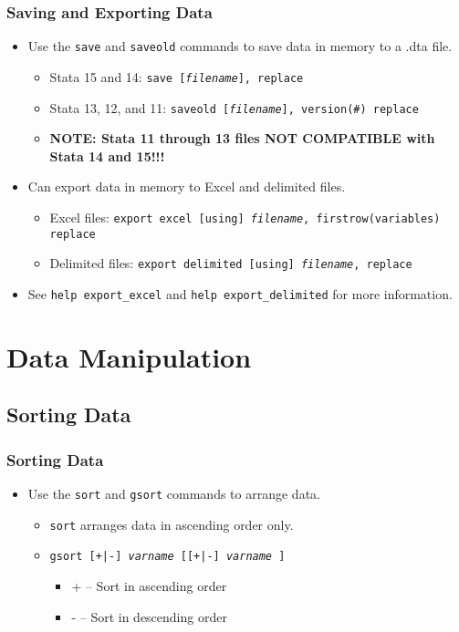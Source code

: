 \documentclass{beamer}
\begin{document}
\begin{frame}
	\frametitle{Saving and Exporting Data}
		\begin{itemize}
			\item Use the \texttt{save} and \texttt{saveold} commands to save data in memory to a .dta file.
				\begin{itemize}
					\item Stata 15 and 14: \texttt{save [\textit{filename}], replace}
					\item Stata 13, 12, and 11: \texttt{saveold [\textit{filename}], version(\#) replace}
					\item \textbf{NOTE: Stata 11 through 13 files NOT COMPATIBLE with Stata 14 and 15!!!}
				\end{itemize}
			\item Can export data in memory to Excel and delimited files.
			\begin{itemize}
				\item Excel files: \texttt{export excel [using] \textit{filename}, firstrow(variables) replace}
				\item Delimited files: \texttt{export delimited [using] \textit{filename}, replace}
			\end{itemize}
			\item See \texttt{help export\_{excel}} and \texttt{help export\_{delimited}} for more information.
		\end{itemize}
\end{frame}

\section{Data Manipulation}

\subsection{Sorting Data}

\begin{frame}
	\frametitle{Sorting Data}
		\begin{itemize}
			\item Use the \texttt{sort} and \texttt{gsort} commands to arrange data.
				\begin{itemize}
					\item \texttt{sort} arranges data in ascending order only.
					\item \texttt{gsort [+|-] \textit{varname} [[+|-] \textit{varname} \textellipsis]}
						\begin{itemize}
							\item + -- Sort in ascending order
							\item - -- Sort in descending order
						\end{itemize}
				\end{itemize}
		\end{itemize}
\end{frame}
\end{document}
